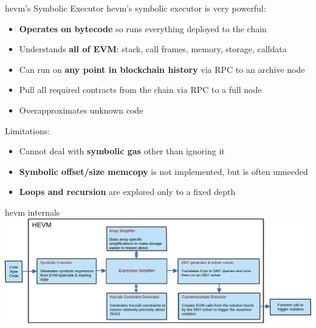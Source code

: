 \documentclass[aspectratio=169]{beamer}
\begin{document}
\begin{frame}{hevm's Symbolic Executor}
hevm's symbolic executor is very powerful:
\begin{itemize}
\item \textbf{Operates on bytecode} so runs everything deployed to the chain
\item Understands \textbf{all of EVM}: stack, call frames, memory, storage, calldata
\item Can run on \textbf{any point in blockchain history} via RPC to an archive node
\item Pull all required contracts from the chain via RPC to a full node
\item Overapproximates unknown code
\end{itemize}
\bigskip

Limitations:
\begin{itemize}
\item Cannot deal with \textbf{symbolic gas} other than ignoring it
\item \textbf{Symbolic offset/size memcopy} is not implemented, but is often unneeded
\item \textbf{Loops and recursion} are explored only to a fixed depth
\end{itemize}
\end{frame}

\begin{frame}{hevm internals}
\centering
\includegraphics[scale=0.6]{hevm-overview}
\end{frame}



\end{document}
